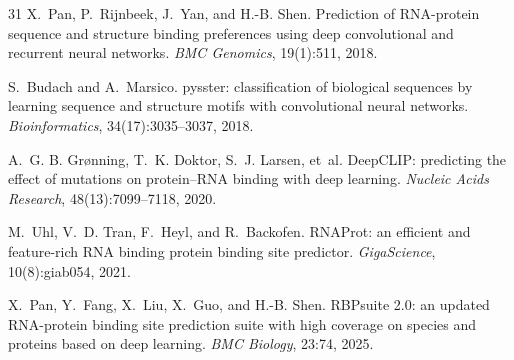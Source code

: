 \begin{thebibliography}{31}
X.~Pan, P.~Rijnbeek, J.~Yan, and H.-B. Shen.
\newblock Prediction of RNA-protein sequence and structure binding preferences using deep
convolutional and recurrent neural networks.
\newblock \emph{BMC Genomics}, 19(1):511, 2018.
\newblock {}

S.~Budach and A.~Marsico.
\newblock pysster: classification of biological sequences by learning sequence and structure
motifs with convolutional neural networks.
\newblock \emph{Bioinformatics}, 34(17):3035--3037, 2018.
\newblock {}

A.~G. B. Gr{\o}nning, T.~K. Doktor, S.~J. Larsen, et~al.
\newblock DeepCLIP: predicting the effect of mutations on protein--RNA binding with deep
learning.
\newblock \emph{Nucleic Acids Research}, 48(13):7099--7118, 2020.
\newblock {}

M.~Uhl, V.~D. Tran, F.~Heyl, and R.~Backofen.
\newblock RNAProt: an efficient and feature-rich RNA binding protein binding site predictor.
\newblock \emph{GigaScience}, 10(8):giab054, 2021.
\newblock {}

X.~Pan, Y.~Fang, X.~Liu, X.~Guo, and H.-B. Shen.
\newblock RBPsuite 2.0: an updated RNA-protein binding site prediction suite with high coverage
on species and proteins based on deep learning.
\newblock \emph{BMC Biology}, 23:74, 2025.
\newblock {}

\end{thebibliography}
